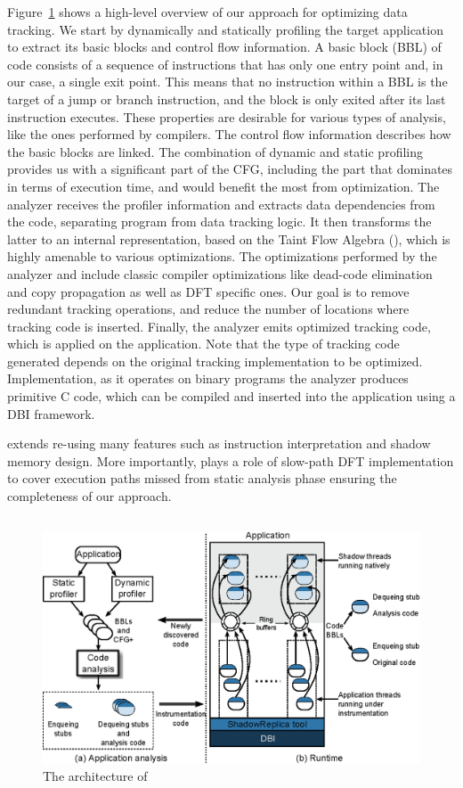 Figure~\ref{fig:approach_overview} shows a high-level overview of our approach
for optimizing data tracking. We start by dynamically and statically profiling
the target application to extract its basic blocks and control flow
information. A basic block (BBL) of code consists of a sequence of instructions
that has only one entry point and, in our case, a single exit point. This means
that no instruction within a BBL is the target of a jump or branch instruction,
and the block is only exited after its last instruction executes. These
properties are desirable for various types of analysis, like the ones performed
by compilers. The control flow information describes how the basic blocks are
linked. The combination of dynamic and static profiling provides us with a
significant part of the CFG, including the part that dominates in terms of
execution time, and would benefit the most from optimization.
%
The analyzer receives the profiler information and extracts data dependencies
from the code, separating program from data tracking logic. It then transforms
the latter to an internal representation, based on the Taint Flow Algebra
(\tfa), which is highly amenable to various optimizations. The optimizations
performed by the analyzer and include classic compiler optimizations like
dead-code elimination and copy propagation as well as DFT specific ones. Our
goal is to remove redundant tracking operations, and reduce the number of
locations where tracking code is inserted. 
%
Finally, the analyzer emits optimized tracking code, which is applied on the
application. Note that the type of tracking code generated depends on the
original tracking implementation to be optimized. Implementation, as it
operates on binary programs the analyzer produces primitive C code, which can
be compiled and inserted into the application using a DBI framework.

\tfa extends \libdft re-using many features such as instruction interpretation
and shadow memory design. More importantly, \libdft plays a role of slow-path
DFT implementation to cover execution paths missed from static analysis phase
ensuring the completeness of our approach.
 
\subsection{\sreplica}

\begin{figure}[tb]
    \centering
    \includegraphics[width=0.64\linewidth]{figs/architecture.eps}
    \caption{The architecture of \sreplica \label{fig:approach_overview}}
\end{figure}

